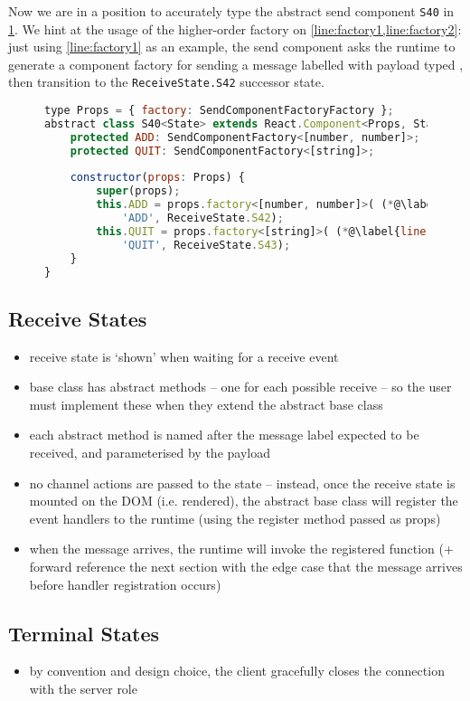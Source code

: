 Now we are in a position to accurately type the abstract
send component \texttt{S40} in \cref{lst:reactsendcomponent}.
We hint at the usage of the higher-order factory on
\cref{line:factory1,line:factory2}:
just using \cref{line:factory1} as an example,
the send component asks the runtime to generate a 
component factory for sending a message 
labelled 
with payload typed
,
then transition to the \texttt{ReceiveState.S42}
successor state.

\begin{figure}[!h]
\begin{lstlisting}[language=javascript,tabsize=2]
type Props = { factory: SendComponentFactoryFactory };
abstract class S40<State> extends React.Component<Props, State> {
	protected ADD: SendComponentFactory<[number, number]>;
	protected QUIT: SendComponentFactory<[string]>;
	
	constructor(props: Props) {
		super(props);
		this.ADD = props.factory<[number, number]>( (*@\label{line:factory1}@*)
			'ADD', ReceiveState.S42);
		this.QUIT = props.factory<[string]>( (*@\label{line:factory2}@*)
			'QUIT', ReceiveState.S43);
	}
}
\end{lstlisting}
\label{lst:reactsendcomponent}
\end{figure}

\subsection{Receive States}
\begin{itemize}
\item receive state is `shown' when waiting for a receive event
\item base class has abstract methods -- one for each possible receive -- so the user must implement these when they extend the abstract base class
\item each abstract method is named after the message label expected to be received, and parameterised by the payload
\item no channel actions are passed to the state -- instead, once the receive state is mounted on the DOM (i.e. rendered), the abstract base class will register the event handlers to the runtime (using the register method passed as props)
\item when the message arrives, the runtime will invoke the registered function (+ forward reference the next section with the edge case that the message arrives before handler registration occurs)
\end{itemize}

\subsection{Terminal States}
\begin{itemize}
\item by convention and design choice, the client gracefully closes the connection with the server role
\end{itemize}